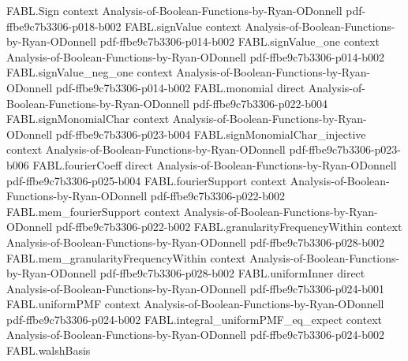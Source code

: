 \begin{theorem}
\label{FABL.biasedFlipProbability_eq_expect_sq_discreteDerivative}
\leanok
{}
\proofstep
  {FABL.Sign}
  {context}
  {Analysis-of-Boolean-Functions-by-Ryan-ODonnell}
  {pdf-ffbe9c7b3306-p018-b002}
\proofstep
  {FABL.signValue}
  {context}
  {Analysis-of-Boolean-Functions-by-Ryan-ODonnell}
  {pdf-ffbe9c7b3306-p014-b002}
\proofstep
  {FABL.signValue_one}
  {context}
  {Analysis-of-Boolean-Functions-by-Ryan-ODonnell}
  {pdf-ffbe9c7b3306-p014-b002}
\proofstep
  {FABL.signValue_neg_one}
  {context}
  {Analysis-of-Boolean-Functions-by-Ryan-ODonnell}
  {pdf-ffbe9c7b3306-p014-b002}
\proofstep
  {FABL.monomial}
  {direct}
  {Analysis-of-Boolean-Functions-by-Ryan-ODonnell}
  {pdf-ffbe9c7b3306-p022-b004}
\proofstep
  {FABL.signMonomialChar}
  {context}
  {Analysis-of-Boolean-Functions-by-Ryan-ODonnell}
  {pdf-ffbe9c7b3306-p023-b004}
\proofstep
  {FABL.signMonomialChar_injective}
  {context}
  {Analysis-of-Boolean-Functions-by-Ryan-ODonnell}
  {pdf-ffbe9c7b3306-p023-b006}
\proofstep
  {FABL.fourierCoeff}
  {direct}
  {Analysis-of-Boolean-Functions-by-Ryan-ODonnell}
  {pdf-ffbe9c7b3306-p025-b004}
\proofstep
  {FABL.fourierSupport}
  {context}
  {Analysis-of-Boolean-Functions-by-Ryan-ODonnell}
  {pdf-ffbe9c7b3306-p022-b002}
\proofstep
  {FABL.mem_fourierSupport}
  {context}
  {Analysis-of-Boolean-Functions-by-Ryan-ODonnell}
  {pdf-ffbe9c7b3306-p022-b002}
\proofstep
  {FABL.granularityFrequencyWithin}
  {context}
  {Analysis-of-Boolean-Functions-by-Ryan-ODonnell}
  {pdf-ffbe9c7b3306-p028-b002}
\proofstep
  {FABL.mem_granularityFrequencyWithin}
  {context}
  {Analysis-of-Boolean-Functions-by-Ryan-ODonnell}
  {pdf-ffbe9c7b3306-p028-b002}
\proofstep
  {FABL.uniformInner}
  {direct}
  {Analysis-of-Boolean-Functions-by-Ryan-ODonnell}
  {pdf-ffbe9c7b3306-p024-b001}
\proofstep
  {FABL.uniformPMF}
  {context}
  {Analysis-of-Boolean-Functions-by-Ryan-ODonnell}
  {pdf-ffbe9c7b3306-p024-b002}
\proofstep
  {FABL.integral_uniformPMF_eq_expect}
  {context}
  {Analysis-of-Boolean-Functions-by-Ryan-ODonnell}
  {pdf-ffbe9c7b3306-p024-b002}
\proofstep
  {FABL.walshBasis}

\end{theorem}
